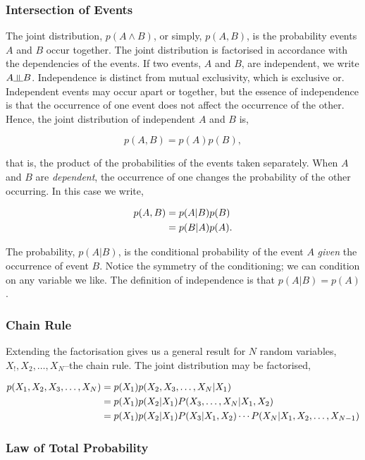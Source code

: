 \documentclass[11pt]{amsart}
\newcommand{\indep}{\rotatebox[origin=c]{90}{$\models$}}
\begin{document}
\subsubsection{Intersection of Events}

The joint distribution, $p(A \land B)$, or simply, $p(A, B)$, is the probability events $A$ and $B$ occur together. The joint distribution is factorised in accordance with the dependencies of the events. If two events, $A$ and $B$, are independent, we write $A \indep B$. Independence is distinct from mutual exclusivity, which is exclusive or. Independent events may occur apart or together, but the essence of independence is that the occurrence of one event does not affect the occurrence of the other. Hence, the joint distribution of independent $A$ and $B$ is,

$$p(A, B) = p(A)p(B),$$

that is, the product of the probabilities of the events taken separately. When $A$ and $B$ are \emph{dependent}, the occurrence of one changes the probability of the other occurring. In this case we write,

\begin{align}
p(A, B) &= p(A|B)p(B) \notag \\
&= p(B|A)p(A). \notag
\end{align}

The probability, $p(A|B)$, is the conditional probability of the event $A$ \emph{given} the occurrence of event $B$. Notice the symmetry of the conditioning; we can condition on any variable we like. The definition of independence is that $p(A|B) = p(A)$.

\subsubsection{Chain Rule}

Extending the factorisation gives us a general result for $N$ random variables, $X_!, X_2, \dots, X_N$--the chain rule. The joint distribution may be factorised,

\begin{align}
p(X_1, X_2, X_3,\dots,X_N) &= p(X_1)p(X_2, X_3, \dots, X_N|X_1) \notag \\
&= p(X_1)p(X_2|X_1)P(X_3, \dots, X_N|X_1, X_2) \notag \\
&= p(X_1)p(X_2|X_1)P(X_3|X_1, X_2)\cdots P(X_N|X_1, X_2, \dots, X_{N-1}) \notag
\end{align}

\subsubsection{Law of Total Probability}
\end{document}
